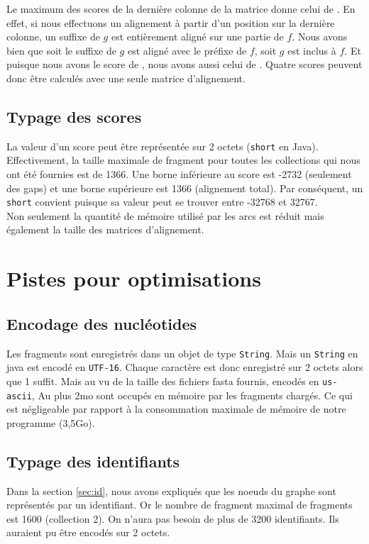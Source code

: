 Le maximum des scores de la dernière colonne de la matrice donne celui de .
En effet, si nous effectuons un alignement à partir d'un position sur la dernière colonne,
un suffixe de $g$ est entièrement aligné sur une partie de $f$.
Nous avons bien que soit le suffixe de $g$ est aligné avec le préfixe de $f$, soit $g$ est inclus à $f$.
Et puisque nous avons le score de , nous avons aussi celui de .
Quatre scores peuvent donc être calculés avec une seule matrice d'alignement.

\subsection{Typage des scores}
La valeur d'un score peut être représentée sur 2 octets (\texttt{short} en Java).
Effectivement, la taille maximale de fragment pour toutes les collections qui
nous ont été fournies est de 1366.
Une borne inférieure au score est -2732 (seulement des gaps)
et une borne supérieure est 1366 (alignement total).
Par conséquent, un \texttt{short} convient puisque sa valeur peut se trouver
entre -32768 et 32767.\\
Non seulement la quantité de mémoire utilisé par les arcs est réduit mais également la taille des matrices d'alignement.

\section{Pistes pour optimisations}
\subsection{Encodage des nucléotides}
Les fragments sont enregistrés dans un objet de type \texttt{String}.
Mais un \texttt{String} en java est encodé en \texttt{UTF-16}.
Chaque caractère est donc enregistré sur 2 octets alors que 1 suffit.
Mais au vu de la taille des fichiers fasta fournis, encodés en \texttt{us-ascii},
Au plus 2mo sont occupés en mémoire par les fragments chargés.
Ce qui est négligeable par rapport à la consommation maximale de mémoire de notre programme (3,5Go).

\subsection{Typage des identifiants}
Dans la section \ref{sec:id}, nous avons expliqués que les noeuds du graphe sont représentés par un identifiant.
Or le nombre de fragment maximal de fragments est 1600 (collection 2). On n'aura pas besoin de plus de 3200 identifiants.
Ils auraient pu être encodés sur 2 octets.